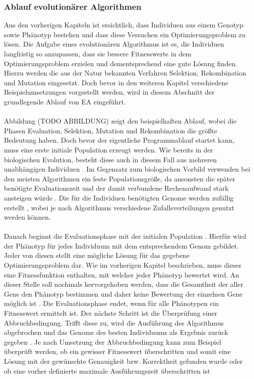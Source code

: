 \subsubsection{Ablauf evolutionärer Algorithmen}
Aus den vorherigen Kapiteln ist ersichtlich, dass Individuen aus einem Genotyp sowie Phänotyp bestehen und dass diese Versuchen ein Optimierungsproblem zu lösen. Die Aufgabe eines evolutionären Algorithmus ist es, die Individuen langfristig so anzupassen, dass sie bessere Fitnesswerte in dem Optimierungsproblem erzielen und dementsprechend eine gute Lösung finden. Hierzu werden die aus der Natur bekannten Verfahren Selektion, Rekombination und Mutation eingesetzt. Doch bevor in den weiteren Kapitel verschiedene Beispielumsetzungen vorgestellt werden, wird in diesem Abschnitt der grundlegende Ablauf von \ac{EA} eingeführt.
\\\\
Abbildung (TODO ABBILDUNG) zeigt den beispielhaften Ablauf, wobei die Phasen Evaluation, Selektion, Mutation und Rekombination die größte Bedeutung haben. Doch bevor der eigentliche Programmablauf startet kann, muss eine erste initiale Population erzeugt werden. Wie bereits in der biologischen Evolution, besteht diese auch in diesem Fall aus mehreren unabhängigen Individuen \cite{rothlauf2006representation}. Im Gegensatz zum biologischen Vorbild verwenden bei den meisten Algorithmen ein feste Populationsgröße, da ansonsten die später benötigte Evaluationszeit und der damit verbundene Rechenaufwand stark ansteigen würde \cite{rothlauf2006representation}. Die für die Individuen benötigten Genome werden zufällig erstellt \cite{weicker2015evolutionare}, wobei je nach Algorithmus verschiedene Zufallsverteilungen genutzt werden können.
\\\\
Danach beginnt die Evaluationsphase mit der initialen Population \cite{rothlauf2006representation}. Hierfür wird der Phänotyp für jedes Individuum mit dem entsprechendem Genom gebildet. Jeder von diesen stellt eine mögliche Lösung für das gegebene Optimierungsproblem dar. Wie im vorherigen Kapitel beschrieben, muss dieses eine Fitnessfunktion enthalten, mit welcher jeder Phänotyp bewertet wird. An dieser Stelle soll nochmals hervorgehoben werden, dass die Gesamtheit der aller Gene den Phänotyp bestimmen und daher keine Bewertung der einzelnen Gene möglich ist \cite{rothlauf2006representation}. Die Evaluationsphase endet, wenn für alle Phänotypen ein Fitnesswert ermittelt ist. Der nächste Schritt ist die Überprüfung einer Abbruchbedingung. Trifft diese zu, wird die Ausführung des Algorithmus abgebrochen und das Genome des besten Individuums als Ergebnis zurück gegeben \cite{weicker2015evolutionare}. Je nach Umsetzung der Abbruchbedingung kann zum Beispiel überprüft werden, ob ein gewisser Fitnesswert überschritten und somit eine Lösung mit der gewünschte Genauigkeit bzw. Korrektheit gefunden wurde oder ob eine vorher definierte maximale Ausführungszeit überschritten ist
